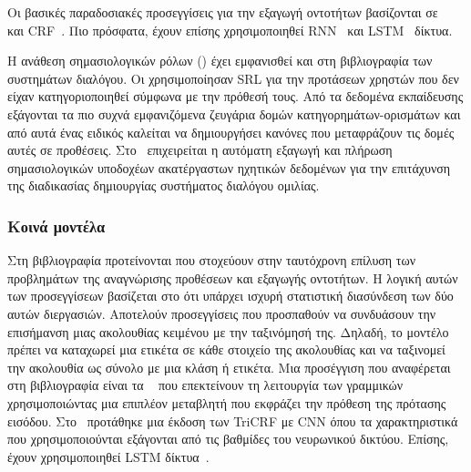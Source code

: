 Οι βασικές παραδοσιακές προσεγγίσεις για την εξαγωγή οντοτήτων βασίζονται σε
~\cite{wang2005spoken} και
CRF~\cite{raymond2007generative,wang2011semantic,wang2016recent,rasa,snips}.
Πιο πρόσφατα, έχουν επίσης χρησιμοποιηθεί RNN~\cite{mesnil2013investigation,yao2013recurrent,mesnil2015using,liu2015recurrent,vu2016bi} και LSTM~\cite{yao2014spoken} δίκτυα.

Η ανάθεση σημασιολογικών ρόλων (\SRLR{}) έχει εμφανισθεί και στη βιβλιογραφία των συστημάτων διαλόγου.
Οι \citet{tur2005semi} χρησιμοποίησαν SRL για την  προτάσεων χρηστών που δεν είχαν κατηγοριοποιηθεί σύμφωνα με την πρόθεσή τους.
Από τα δεδομένα εκπαίδευσης εξάγονται τα πιο συχνά εμφανιζόμενα ζευγάρια δομών κατηγορημάτων-ορισμάτων και από αυτά ένας ειδικός καλείται να δημιουργήσει κανόνες που μεταφράζουν τις δομές αυτές σε προθέσεις.
Στο~\cite{chen2013unsupervised} επιχειρείται η αυτόματη εξαγωγή και πλήρωση σημασιολογικών υποδοχέων ακατέργαστων ηχητικών δεδομένων για την επιτάχυνση της διαδικασίας δημιουργίας συστήματος διαλόγου ομιλίας.

\subsubsection{Κοινά μοντέλα}
Στη βιβλιογραφία προτείνονται 
που στοχεύουν στην ταυτόχρονη επίλυση των προβλημάτων της αναγνώρισης προθέσεων και εξαγωγής οντοτήτων.
Η λογική αυτών των προσεγγίσεων βασίζεται στο ότι υπάρχει ισχυρή στατιστική διασύνδεση των δύο αυτών διεργασιών.
Αποτελούν προσεγγίσεις που προσπαθούν να συνδυάσουν την επισήμανση μιας ακολουθίας κειμένου με την ταξινόμησή της.
Δηλαδή, το μοντέλο πρέπει να καταχωρεί μια ετικέτα σε κάθε στοιχείο της ακολουθίας και να ταξινομεί την ακολουθία ως σύνολο με μια κλάση ή ετικέτα.
Μια προσέγγιση που αναφέρεται στη βιβλιογραφία είναι τα
~\cite{jeong2008triangular}
που επεκτείνουν τη λειτουργία των γραμμικών \CRFR{} χρησιμοποιώντας μια επιπλέον μεταβλητή που εκφράζει την πρόθεση της πρότασης εισόδου.
Στο~\cite{xu2013convolutional} προτάθηκε μια έκδοση των TriCRF με CNN όπου τα χαρακτηριστικά που χρησιμοποιούνται εξάγονται από τις βαθμίδες του νευρωνικού δικτύου.
Επίσης, έχουν χρησιμοποιηθεί LSTM δίκτυα~\cite{hakkani2016multi,zhou2016hierarchical}.

